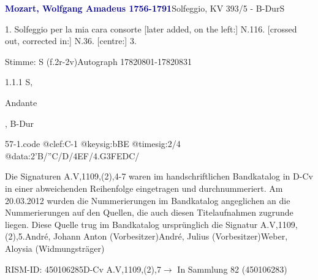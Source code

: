 \documentclass[a4paper, twocolumn, 11pt]{book}
\begin{document}
\par \vspace{16pt} \textcolor{darkblue}{\textbf{Mozart, Wolfgang Amadeus  1756-1791}}\hfillplus{[57]}\newline Solfeggio, KV 393/5 - B-Dur\newline S
\par \begin{itshape} 1. Solfeggio per la mia cara consorte [later added, on the left:] N.116. [crossed out, corrected in:] N.36.  [centre:] 3.\end{itshape} 
\par \textcolor{darkblue}{}  Stimme: S  (f.2r-2v)\newline Autograph  17820801-17820831
\par 1.1.1  S, \begin{itshape}Andante\end{itshape}, B-Dur  
\begin{filecontents*}{57-1.code}
@clef:C-1
@keysig:bBE
@timesig:2/4
@data:2'B/''C/D/4EF/4.G{3FEDC}/
\end{filecontents*}
\newline %
\par Die Signaturen A.V,1109,(2),4-7 waren im handschriftlichen Bandkatalog in D-Cv in einer abweichenden Reihenfolge eingetragen und durchnummeriert. Am 20.03.2012 wurden die Nummerierungen im Bandkatalog angeglichen an die Nummerierungen auf den Quellen, die auch diesen Titelaufnahmen zugrunde liegen. Diese Quelle trug im Bandkatalog ursprünglich die Signatur A.V,1109,(2),5.\newline André, Johann Anton  (Vorbesitzer)\newline André, Julius  (Vorbesitzer)\newline Weber, Aloysia  (Widmungsträger)
\par RISM-ID: 450106285\newline D-Cv  A.V,1109,(2),7\newline $\rightarrow$ In Sammlung 82 (450106283)
      
\end{document}
